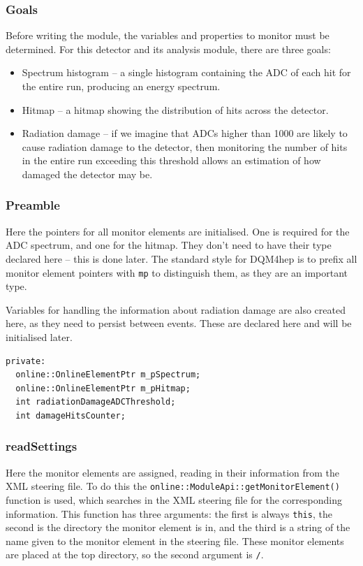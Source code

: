 \subsubsection{Goals}
Before writing the module, the variables and properties to monitor must be determined. For this detector and its analysis module, there are three goals:

\begin{itemize}
	\item Spectrum histogram -- a single histogram containing the \acrshort{ADC} of each hit for the entire run, producing an energy spectrum.
	\item Hitmap -- a hitmap showing the distribution of hits across the detector.
	\item Radiation damage -- if we imagine that \acrshort{ADC}s higher than 1000 are likely to cause radiation damage to the detector, then monitoring the number of hits in the entire run exceeding this threshold allows an estimation of how damaged the detector may be.
\end{itemize}

\subsubsection{Preamble}
Here the pointers for all monitor elements are initialised. One is required for the \acrshort{ADC} spectrum, and one for the hitmap. They don't need to have their type declared here -- this is done later. The standard style for \acrshort{DQM4hep} is to prefix all monitor element pointers with \texttt{m\textunderscore p} to distinguish them, as they are an important type.

Variables for handling the information about radiation damage are also created here, as they need to persist between events. These are declared here and will be initialised later.

\begin{lstlisting}
private:
  online::OnlineElementPtr m_pSpectrum;
  online::OnlineElementPtr m_pHitmap;
  int radiationDamageADCThreshold;
  int damageHitsCounter;
\end{lstlisting}

\subsubsection{readSettings}
Here the monitor elements are assigned, reading in their information from the \acrshort{XML} steering file. To do this the \texttt{online::ModuleApi::getMonitorElement()} function is used, which searches in the \acrshort{XML} steering file for the corresponding information. This function has three arguments: the first is always \texttt{this}, the second is the directory the monitor element is in, and the third is a string of the name given to the monitor element in the steering file. These monitor elements are placed at the top directory, so the second argument is \texttt{/}.

